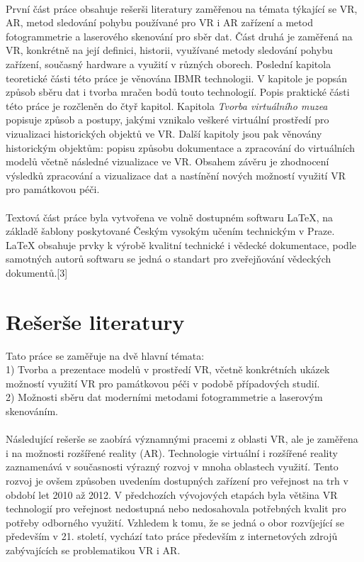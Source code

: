 \documentclass[a4paper, 12pt]{report}
\begin{document}
\\
První část práce obsahuje rešerši literatury zaměřenou na témata týkající se VR, AR, metod sledování pohybu používané pro VR i AR zařízení a metod fotogrammetrie a laserového skenování pro sběr dat. Část druhá je zaměřená na VR, konkrétně na její definici, historii, využívané metody sledování pohybu zařízení, současný hardware a využití v různých oborech. Poslední kapitola teoretické části této práce je věnována IBMR technologii. V kapitole je popsán způsob sběru dat i tvorba mračen bodů touto technologií. Popis praktické části této práce je rozčleněn do čtyř kapitol. Kapitola \textit{Tvorba virtuálního muzea} popisuje způsob a postupy, jakými vznikalo veškeré virtuální prostředí pro vizualizaci historických objektů ve VR. Další kapitoly jsou pak věnovány historickým objektům: popisu způsobu dokumentace a zpracování do virtuálních modelů včetně následné vizualizace ve VR. Obsahem závěru je zhodnocení výsledků zpracování a vizualizace dat a nastínění nových možností využití VR pro památkovou péči.\\
\\
Textová část práce byla vytvořena ve volně dostupném softwaru LaTeX, na základě šablony poskytované Českým vysokým učením technickým v Praze. LaTeX obsahuje prvky k výrobě kvalitní technické i vědecké dokumentace, podle samotných autorů softwaru se jedná o standart pro zveřejňování vědeckých dokumentů.[3]

\chapter{Rešerše literatury}
Tato práce se zaměřuje na dvě hlavní témata: \\
1) Tvorba a prezentace modelů v prostředí VR, včetně konkrétních ukázek možností využití VR pro památkovou péči v podobě případových studií. \\
2) Možnosti sběru dat moderními metodami fotogrammetrie a laserovým skenováním.\\
\\
Následující rešerše se zaobírá významnými pracemi z oblasti VR, ale je zaměřena i na možnosti rozšířené reality (AR). Technologie virtuální i rozšířené reality zaznamenává v současnosti výrazný rozvoj v mnoha oblastech využití. Tento rozvoj je ovšem způsoben uvedením dostupných zařízení pro veřejnost na trh v období let 2010 až 2012. V předchozích vývojových etapách byla většina VR technologií pro veřejnost nedostupná nebo nedosahovala potřebných kvalit pro potřeby odborného využití. Vzhledem k tomu, že se jedná o obor rozvíjející se především v 21. století, vychází tato práce především z internetových zdrojů zabývajících se problematikou VR i AR. 
\end{document}
